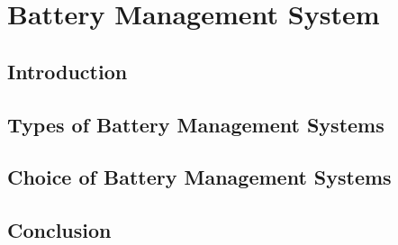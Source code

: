 \chapter{Battery Management System}
\section{Introduction}
\section{Types of Battery Management Systems}
\section{Choice of Battery Management Systems}
\section{Conclusion}